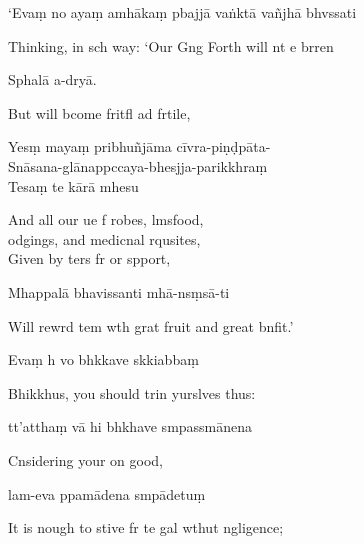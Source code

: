 `Evaṃ no ayaṃ amhākaṃ pbajjā vaṅktā vañjhā bhvssati

\begin{english}
  Thinking, in sch  way: `Our Gng Forth will nt e brren
\end{english}

Sphalā a-dryā.

\begin{english}
  But will bcome fritfl ad frtile,
\end{english}

Yesṃ mayaṃ pribhuñjāma cīvra-piṇḍpāta-\\
Snāsana-glānappccaya-bhesjja-parikkhraṃ\\
Tesaṃ te kārā mhesu

\begin{english}
  And all our ue f robes, lmsfood,\\
  odgings, and medicnal rqusites,\\
  Given by ters fr or spport,
\end{english}

Mhappalā bhavissanti mhā-nsṃsā-ti

\begin{english}
  Will rewrd tem wth grat fruit and great bnfit.'
\end{english}

Evaṃ h vo bhkkave skkiabbaṃ

\begin{english}
  Bhikkhus, you should trin yurslves thus:
\end{english}

tt'atthaṃ vā hi bhkhave smpassmānena

\begin{english}
  Cnsidering your on good,
\end{english}

lam-eva ppamādena smpādetuṃ

\begin{english}
  It is nough to stive fr te gal wthut ngligence;
\end{english}

